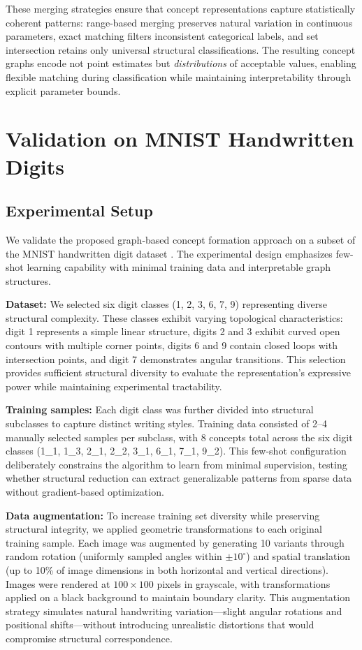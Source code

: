 \documentclass[runningheads]{llncs}
\begin{document}
These merging strategies ensure that concept representations capture statistically coherent patterns: range-based merging preserves natural variation in continuous parameters, exact matching filters inconsistent categorical labels, and set intersection retains only universal structural classifications. The resulting concept graphs encode not point estimates but \emph{distributions} of acceptable values, enabling flexible matching during classification while maintaining interpretability through explicit parameter bounds.

\section{Validation on MNIST Handwritten Digits}

\subsection{Experimental Setup}

We validate the proposed graph-based concept formation approach on a subset of the MNIST handwritten digit dataset \cite{lecun2002gradient}. The experimental design emphasizes few-shot learning capability with minimal training data and interpretable graph structures.

\textbf{Dataset:} We selected six digit classes (1, 2, 3, 6, 7, 9) representing diverse structural complexity. These classes exhibit varying topological characteristics: digit 1 represents a simple linear structure, digits 2 and 3 exhibit curved open contours with multiple corner points, digits 6 and 9 contain closed loops with intersection points, and digit 7 demonstrates angular transitions. This selection provides sufficient structural diversity to evaluate the representation's expressive power while maintaining experimental tractability.

\textbf{Training samples:} Each digit class was further divided into structural subclasses to capture distinct writing styles. Training data consisted of 2--4 manually selected samples per subclass, with 8 concepts total across the six digit classes (1\_1, 1\_3, 2\_1, 2\_2, 3\_1, 6\_1, 7\_1, 9\_2). This few-shot configuration deliberately constrains the algorithm to learn from minimal supervision, testing whether structural reduction can extract generalizable patterns from sparse data without gradient-based optimization.

\textbf{Data augmentation:} To increase training set diversity while preserving structural integrity, we applied geometric transformations to each original training sample. Each image was augmented by generating 10 variants through random rotation (uniformly sampled angles within $\pm 10^\circ$) and spatial translation (up to 10\% of image dimensions in both horizontal and vertical directions). Images were rendered at $100 \times 100$ pixels in grayscale, with transformations applied on a black background to maintain boundary clarity. This augmentation strategy simulates natural handwriting variation---slight angular rotations and positional shifts---without introducing unrealistic distortions that would compromise structural correspondence.
\end{document}
